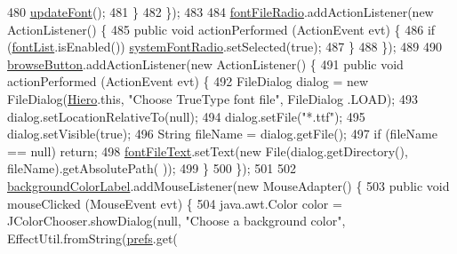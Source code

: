 \begin{DoxyCode}
480                 \mbox{\hyperlink{classorg_1_1newdawn_1_1slick_1_1tools_1_1hiero_1_1_hiero_aaee4b931c33090913c970c8484c90af7}{updateFont}}();
481             \}
482         \});
483 
484         \mbox{\hyperlink{classorg_1_1newdawn_1_1slick_1_1tools_1_1hiero_1_1_hiero_a2adc5b7c8bcbf375142240e2ab009adf}{fontFileRadio}}.addActionListener(\textcolor{keyword}{new} ActionListener() \{
485             \textcolor{keyword}{public} \textcolor{keywordtype}{void} actionPerformed (ActionEvent evt) \{
486                 \textcolor{keywordflow}{if} (\mbox{\hyperlink{classorg_1_1newdawn_1_1slick_1_1tools_1_1hiero_1_1_hiero_aab47a05761c02f71b369618db21bbb17}{fontList}}.isEnabled()) \mbox{\hyperlink{classorg_1_1newdawn_1_1slick_1_1tools_1_1hiero_1_1_hiero_a59931ca39c1c08a384804e587259075f}{systemFontRadio}}.setSelected(\textcolor{keyword}{true});
487             \}
488         \});
489 
490         \mbox{\hyperlink{classorg_1_1newdawn_1_1slick_1_1tools_1_1hiero_1_1_hiero_a2a832e3532956e0f2a7fa390f9b8bc27}{browseButton}}.addActionListener(\textcolor{keyword}{new} ActionListener() \{
491             \textcolor{keyword}{public} \textcolor{keywordtype}{void} actionPerformed (ActionEvent evt) \{
492                 FileDialog dialog = \textcolor{keyword}{new} FileDialog(\mbox{\hyperlink{classorg_1_1newdawn_1_1slick_1_1tools_1_1hiero_1_1_hiero_ad35908dac0e9755fd418874dff6d2dcd}{Hiero}}.this, \textcolor{stringliteral}{"Choose TrueType font file"}, FileDialog
      .LOAD);
493                 dialog.setLocationRelativeTo(null);
494                 dialog.setFile(\textcolor{stringliteral}{"*.ttf"});
495                 dialog.setVisible(\textcolor{keyword}{true});
496                 String fileName = dialog.getFile();
497                 \textcolor{keywordflow}{if} (fileName == null) \textcolor{keywordflow}{return};
498                 \mbox{\hyperlink{classorg_1_1newdawn_1_1slick_1_1tools_1_1hiero_1_1_hiero_a0711e1f725339751c6784796d43bf97a}{fontFileText}}.setText(\textcolor{keyword}{new} File(dialog.getDirectory(), fileName).getAbsolutePath(
      ));
499             \}
500         \});
501 
502         \mbox{\hyperlink{classorg_1_1newdawn_1_1slick_1_1tools_1_1hiero_1_1_hiero_a04c540a8cc98417075e589a6aa7e0ad1}{backgroundColorLabel}}.addMouseListener(\textcolor{keyword}{new} MouseAdapter() \{
503             \textcolor{keyword}{public} \textcolor{keywordtype}{void} mouseClicked (MouseEvent evt) \{
504                 java.awt.Color color = JColorChooser.showDialog(null, \textcolor{stringliteral}{"Choose a background color"}, 
      EffectUtil.fromString(\mbox{\hyperlink{classorg_1_1newdawn_1_1slick_1_1tools_1_1hiero_1_1_hiero_aa7062bea3ffd4639b589cd06000dbfc6}{prefs}}.get(

\end{DoxyCode}
